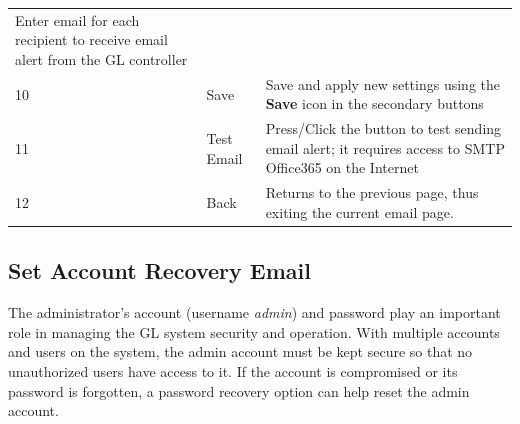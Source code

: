 \begin{longtable}[]{@{}lll@{}}
\begin{minipage}[t]{0.65\columnwidth}
Enter email for each recipient to receive email alert from the GL
controller\strut
\end{minipage}\tabularnewline
\begin{minipage}[t]{0.04\columnwidth}\raggedright
10\strut
\end{minipage} & \begin{minipage}[t]{0.23\columnwidth}\raggedright
Save\strut
\end{minipage} & \begin{minipage}[t]{0.65\columnwidth}\raggedright
Save and apply new settings using the \textbf{Save} icon in the
secondary buttons\strut
\end{minipage}\tabularnewline
\begin{minipage}[t]{0.04\columnwidth}\raggedright
11\strut
\end{minipage} & \begin{minipage}[t]{0.23\columnwidth}\raggedright
Test Email\strut
\end{minipage} & \begin{minipage}[t]{0.65\columnwidth}\raggedright
Press/Click the button to test sending email alert; it requires access
to SMTP Office365 on the Internet\strut
\end{minipage}\tabularnewline
\begin{minipage}[t]{0.04\columnwidth}\raggedright
12\strut
\end{minipage} & \begin{minipage}[t]{0.23\columnwidth}\raggedright
Back\strut
\end{minipage} & \begin{minipage}[t]{0.65\columnwidth}\raggedright
Returns to the previous page, thus exiting the current email page.\strut
\end{minipage}\tabularnewline
\bottomrule
\end{longtable}


\subsection{Set Account Recovery
Email}

The administrator's account (username \emph{admin}) and password play an
important role in managing the GL system security and operation. With
multiple accounts and users on the system, the admin account must be
kept secure so that no unauthorized users have access to it. If the
account is compromised or its password is forgotten, a password recovery
option can help reset the admin account.

